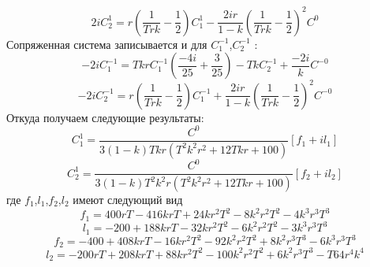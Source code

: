 \documentclass[12pt]{article}
\begin{document}
 \begin{equation*}
     2i C_2^1=r \left(  \frac{1}{T r k} - \frac{1}{2}\right) C_1^1-\frac{2 i r}{1-k} \left(\frac{1}{T r k} - \frac{1}{2} \right)^2 C^0
 \end{equation*}
 Сопряженная система записывается и для $C_1^{-1}$,$C_2^{-1}$ :
 \begin{equation*}
     -2i C_1^{-1}=T k r C_1^{-1}( \frac{-4i}{25}+\frac{3}{25})- T k C_2^{-1} + \frac{-2i}{k} C^{-0}
 \end{equation*}
 \begin{equation*}
     -2i C_2^{-1}=r \left(  \frac{1}{T r k} - \frac{1}{2}\right) C_1^{-1}+\frac{2 i r}{1-k} \left(\frac{1}{T r k} - \frac{1}{2} \right)^2 C^{-0}
 \end{equation*}
 Откуда получаем следующие результаты:
\begin{equation*}
    C^1_1 =\frac{C^0}{3(1-k)T k r( T^2 k^2 r^2 + 12 T k r + 100)}[f_1 + i l_1]
\end{equation*}
\begin{equation*}
    C^1_2 =\frac{C^0}{3(1-k)T^2 k^2 r (T^2 k^2 r^2 + 12 T k r + 100)}[f_2+ i l_2]
\end{equation*}
где $f_1$,$l_1$,$f_2$,$l_2$ имеют следующий вид
\begin{equation*}
   f_1=400 r T -416 k r T +24 k r^2 T^2-8 k^2 r^2 T^2 -4 k^3 r^3 T^3 
\end{equation*}
\begin{equation*}
    l_1=-200 + 188 k r T - 32 k r^2 T^2-6 k^2 r^2 T^2 - 3 k^3 r^3 T^3
\end{equation*}
\begin{equation*}
    f_2=-400 +408 k r T - 16 k r^2 T^2 -92 k^2 r^2 T^2 +8 k^2 r^3 T^3 -6 k^3 r^3 T^3
\end{equation*}
\begin{equation*}
    l_2=-200 r T + 208 k r T +88 k r^2 T^2 -100 k^2 r^2 T^2 +6 k^2 r^3 T^3 - T64 r^4 k^4
\end{equation*}
\end{document}
